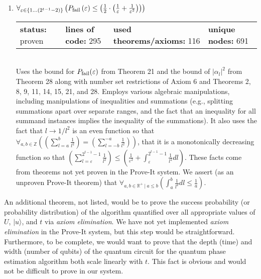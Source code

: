 \documentclass{article}[12pt]
\begin{document}
\begin{enumerate}
\item $\forall_{\varepsilon \in \{1\ldots \left(2^{t - 1} - 2\right)\}} \left(P_{\rm fail}\left(\varepsilon\right) \leq \left(\frac{1}{2} \cdot \left(\frac{1}{\varepsilon} + \frac{1}{\varepsilon^{2}}\right)\right)\right)$ \hfill \\
  \begin{tabular}{l | l | l | l}
    \textbf{status:} proven & \textbf{lines of code:} 295 & \textbf{used theorems/axioms:} 116 & \textbf{unique nodes:} 691
  \end{tabular} \hfill \\
  Uses the bound for $P_{\rm fail}(\varepsilon)$ from Theorem 21 and the bound of $\lvert \alpha_l \rvert^2$ from Theorem 28 along with number set restrictions of Axiom 6 and Theorems 2, 8, 9, 11, 14, 15, 21, and 28.  Employs various algebraic manipulations, including manipulations of inequalities and summations (e.g., splitting summations apart over separate ranges, and the fact that an inequality for all summand instances implies the inequality of the summations).  It also uses the fact that $l \rightarrow 1/l^2$ is an even function so that $\forall_{a, b \in \mathbb{Z}} \left(\left(\sum_{l=a}^{b} \frac{1}{l^{2}}\right) = \left(\sum_{l=-b}^{-a} \frac{1}{l^{2}}\right)\right)$, that it is a monotonically decreasing function so that $\left(\sum_{l=\varepsilon}^{2^{t - 1} - 1} \frac{1}{l^{2}}\right) \leq \left(\frac{1}{\varepsilon^{2}} + \int_{\varepsilon}^{2^{t - 1} - 1}\frac{1}{l^{2}}dl\right)$.  These facts come from theorems not yet proven in the Prove-It system.  We assert (as an unproven Prove-It theorem) that $\forall_{a, b \in \mathbb{R}^+~|~a \leq b} \left(\int_{a}^{b}\frac{1}{l^{2}}dl \leq \frac{1}{a}\right)$.
\end{enumerate}
An additional theorem, not listed, would be to prove the success probability (or probability distribution) of the algorithm quantified over all appropriate values of $U$, $\lvert u \rangle$, and $t$ via {\em axiom elimination}.  We have not yet implemented {\em axiom elimination} in the Prove-It system, but this step would be straightforward.  Furthermore, to be complete, we would want to prove that the depth (time) and width (number of qubits) of the quantum circuit for the quantum phase estimation algorithm both scale linearly with $t$.  This fact is obvious and would not be difficult to prove in our system.
\end{document}
